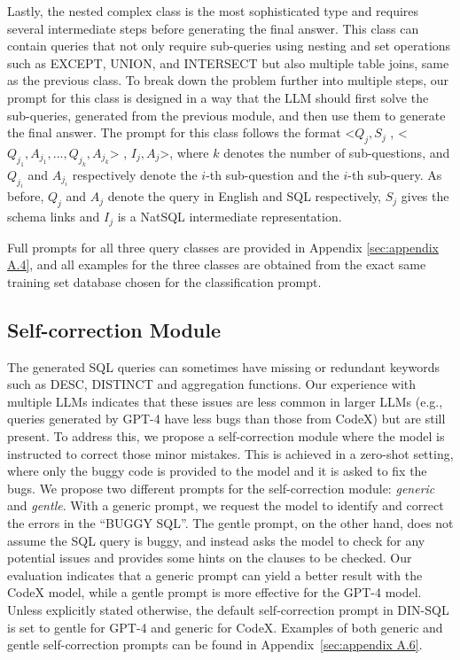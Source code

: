 Lastly, the nested complex class is the most sophisticated type and requires several intermediate steps before generating the final answer. This class can contain queries that not only require sub-queries using nesting and set operations such as EXCEPT, UNION, and INTERSECT but also multiple table joins, same as the previous class. To break down the problem further into multiple steps, our prompt for this class is designed in a way that the LLM should first solve the sub-queries, generated from the previous module, and then use them to generate the final answer. The prompt for this class follows the format
<$Q_{j} , S_{j}$ , <$Q_{j_{1}}, A_{j_{1}} , ... , Q_{j_{k}} , A_{j_{k}}$> , $I_{j}, A_{j}$>,
where $k$ denotes the number of sub-questions, and $Q_{j_{i}}$ and $A_{j_{i}}$ respectively denote the $i$-th sub-question and the $i$-th sub-query. As before, $Q_j$ and $A_j$ denote the query in English and SQL respectively, $S_{j}$ gives the schema links and $I_{j}$ is a NatSQL intermediate representation.

 Full prompts for all three query classes are provided in Appendix \ref{sec:appendix A.4}, and all examples for the three classes are obtained from the exact same training set database chosen for the classification prompt.

\subsection{Self-correction Module}
The generated SQL queries can sometimes have missing or redundant keywords such as DESC, DISTINCT and aggregation functions. Our experience with multiple LLMs indicates that these issues are less common in larger LLMs (e.g., queries generated by GPT-4 have less bugs than those from CodeX) but are still present. To address this, we propose a self-correction module where the model is instructed to correct those minor mistakes.
This is achieved in a zero-shot setting, where only the buggy code is provided to the model and it is asked to fix the bugs. %
We propose two different prompts for the self-correction module: \textit{generic} and \textit{gentle}. With a generic prompt, we request the model to identify and correct the errors in the ``BUGGY SQL''. The gentle prompt, on the other hand, does not assume the SQL query is buggy, and instead asks the model to check for any potential issues and provides some hints on the clauses to be checked. Our evaluation indicates that a generic prompt can yield a better result with the CodeX model, while a gentle prompt is more effective for the GPT-4 model. Unless explicitly stated otherwise, the default self-correction prompt in DIN-SQL is set to gentle for GPT-4 and generic for CodeX. 
Examples of both generic and gentle self-correction prompts can be found in Appendix~\ref{sec:appendix A.6}.

